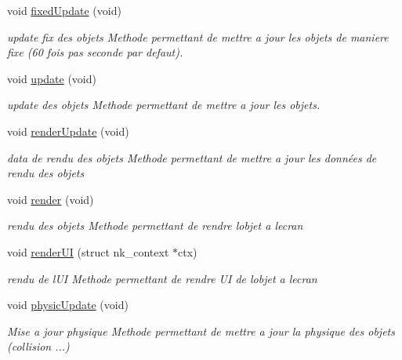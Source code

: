 \begin{DoxyCompactItemize}
void \mbox{\hyperlink{class_beer_engine_1_1_a_scene_a98c0b2bca184f5ba2c7a1660bead32cf}{fixed\+Update}} (void)
\begin{DoxyCompactList}\small\item\em update fix des objets Methode permettant de mettre a jour les objets de maniere fixe (60 fois pas seconde par defaut). \end{DoxyCompactList}\item 
void \mbox{\hyperlink{class_beer_engine_1_1_a_scene_aee4c99b65b3e54bdcb62cc1096dcb397}{update}} (void)
\begin{DoxyCompactList}\small\item\em update des objets Methode permettant de mettre a jour les objets. \end{DoxyCompactList}\item 
void \mbox{\hyperlink{class_beer_engine_1_1_a_scene_accb108fe6723d99c36a85eb51a25820e}{render\+Update}} (void)
\begin{DoxyCompactList}\small\item\em data de rendu des objets Methode permettant de mettre a jour les données de rendu des objets \end{DoxyCompactList}\item 
void \mbox{\hyperlink{class_beer_engine_1_1_a_scene_a445ef1917ea393ebea9be85bf0aa37f1}{render}} (void)
\begin{DoxyCompactList}\small\item\em rendu des objets Methode permettant de rendre l\textquotesingle{}objet a l\textquotesingle{}ecran \end{DoxyCompactList}\item 
void \mbox{\hyperlink{class_beer_engine_1_1_a_scene_a93d3ef94fbd5201f10e9185833bc3e0c}{render\+UI}} (struct nk\+\_\+context $\ast$ctx)
\begin{DoxyCompactList}\small\item\em rendu de l\textquotesingle{}UI Methode permettant de rendre UI de l\textquotesingle{}objet a l\textquotesingle{}ecran \end{DoxyCompactList}\item 
void \mbox{\hyperlink{class_beer_engine_1_1_a_scene_a1b9cff7ce753a578cdd1b95308a22fec}{physic\+Update}} (void)
\begin{DoxyCompactList}\small\item\em Mise a jour physique Methode permettant de mettre a jour la physique des objets (collision ...) \end{DoxyCompactList}\item 

\end{DoxyCompactItemize}
